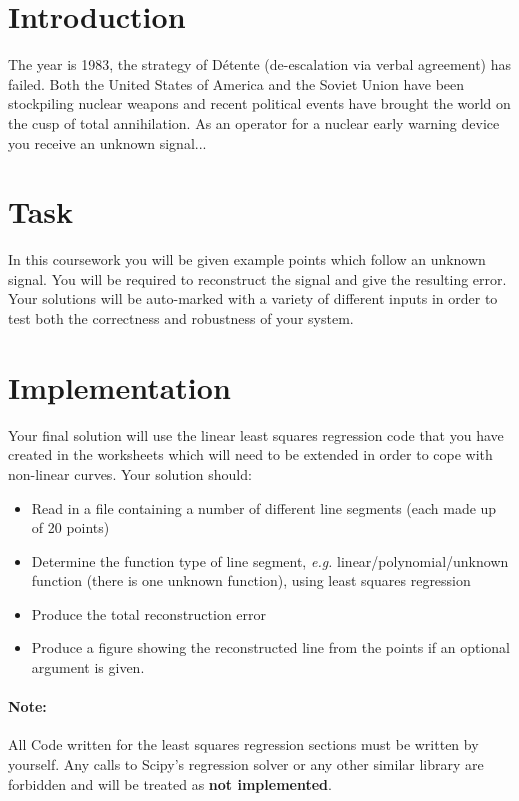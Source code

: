 \documentclass[12pt]{article}
\author{Michael Wray \& Davide Moltisanti}
\begin{document}
\maketitle

\section{Introduction}
\label{sec:intro}
The year is 1983, the strategy of D\'etente (de-escalation via verbal agreement) has failed.
Both the United States of America and the Soviet Union have been stockpiling nuclear weapons and recent political events have brought the world on the cusp of total annihilation.
As an operator for a nuclear early warning device you receive an unknown signal... 

\section{Task}
\label{sec:task}
In this coursework you will be given example points which follow an unknown signal.
You will be required to reconstruct the signal and give the resulting error.
Your solutions will be auto-marked with a variety of different inputs in order to test both the correctness and robustness of your system. 

\section{Implementation}
\label{sec:implementation}
Your final solution will use the linear least squares regression code that you have created in the worksheets which will need to be extended in order to cope with non-linear curves.
Your solution should:
\begin{itemize}
    \item Read in a file containing a number of different line segments (each made up of 20 points)
    \item Determine the function type of line segment, \textit{e.g.} linear/polynomial/unknown function (there is one unknown function), using least squares regression 
    \item Produce the total reconstruction error 
    \item Produce a figure showing the reconstructed line from the points if an optional argument is given. 
\end{itemize}

\paragraph{Note:} All Code written for the least squares regression sections must be written by yourself.
Any calls to Scipy's regression solver or any other similar library are forbidden and will be treated as \textbf{not implemented}.
\end{document}
